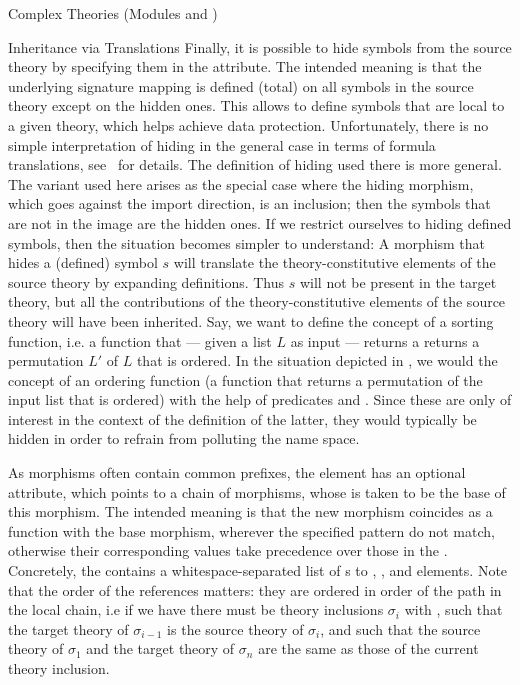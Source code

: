 \begin{tchapter}[id=complex-theories,short=Complex Theories]{Complex Theories (Modules
    {} and {})}
\begin{tsection}[id=morphisms]{Inheritance via Translations}
Finally, it is possible to hide symbols from the source theory by specifying them in the
{} attribute. The intended meaning is that the underlying
signature mapping is defined (total) on all symbols in the source theory except on the
hidden ones. This allows to define symbols that are local to a given theory, which helps
achieve data protection. Unfortunately, there is no simple interpretation of hiding in the
general case in terms of formula translations, see~\cite{CoFI:2004:CASL-RM,MAH-06-a} for
details. The definition of hiding used there is more general. The variant used here arises
as the special case where the hiding morphism, which goes against the import direction, is
an inclusion; then the symbols that are not in the image are the hidden ones.  If we
restrict ourselves to hiding defined symbols, then the situation becomes simpler to
understand: A morphism that hides a (defined) symbol $s$ will translate the
theory-constitutive elements of the source theory by expanding definitions. Thus $s$ will
not be present in the target theory, but all the contributions of the theory-constitutive
elements of the source theory will have been inherited. Say, we want to define the concept
of a sorting function, i.e. a function that --- given a list $L$ as input --- returns a
returns a permutation $L'$ of $L$ that is ordered. In the situation depicted in
{}, we would the concept of an ordering function (a function
that returns a permutation of the input list that is ordered) with the help of predicates
{} and {}. Since these are only of interest in the context
of the definition of the latter, they would typically be hidden in order to refrain from
polluting the name space.

As morphisms often contain common prefixes, the {} element has an
optional {} attribute, which points to a chain of
morphisms, whose {} is taken to be the base of
this morphism. The intended meaning is that the new morphism coincides as a function with
the base morphism, wherever the specified pattern do not match, otherwise their
corresponding values take precedence over those in the {}.
Concretely, the {} contains a whitespace-separated list of
{s} to {}, {},
and {} elements. Note that the order of the references matters: they are
ordered in order of the path in the local chain, i.e if we have
{} there must be theory inclusions
$\sigma_i$ with {}, such that the target theory
of $\sigma_{i-1}$ is the source theory of $\sigma_i$, and such that the source theory of
$\sigma_1$ and the target theory of $\sigma_n$ are the same as those of the current theory
inclusion.


\end{tsection}
\end{tchapter}
